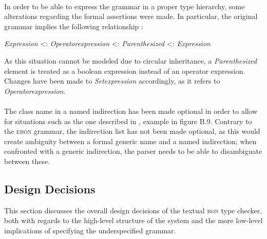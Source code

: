 \paragraph{} In order to be able to express the grammar in a proper type hierarchy, some alterations regarding the formal assertions were made. In particular, the original grammar implies the following relationship \cite[p.~357]{walden1995}:
\begin{center}
\textit{Expression} \textless : \textit{Operator\textunderscore expression} \textless : \textit{Parenthesized} \textless : \textit{Expression}
\end{center}
As this situation cannot be modeled due to circular inheritance, a \textit{Parenthesized} element is treated as a boolean expression instead of an operator expression. Changes have been made to \textit{Set\textunderscore expression} accordingly, as it refers to \textit{Operator\textunderscore expression}.
\paragraph{} The class name in a named indirection has been made optional in order to allow for situations such as the one described in \cite[p.~372]{walden1995}, example in figure B.9. Contrary to the \textsc{ebon} grammar, the indirection list has not been made optional, as this would create ambiguity between a formal generic name and a named indirection; when confronted with a generic indirection, the parser needs to be able to disambiguate between these.

\subsection{Design Decisions}
This section discusses the overall design decisions of the textual \textsc{bon} type checker, both with regards to the high-level structure of the system and the more low-level implications of specifying the underspecified grammar.
